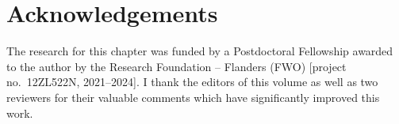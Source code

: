 \documentclass[output=paper,colorlinks,citecolor=brown]{langscibook}
\begin{document}
\section*{Acknowledgements}

\begin{sloppypar}
The research for this chapter was funded by a Postdoctoral Fellowship awarded to the author by the Research Foundation -- Flanders (FWO) [project no.~12ZL522N, 2021--2024]. I thank the editors of this volume as well as two reviewers for their valuable comments which have significantly improved this work.
\end{sloppypar}


{\sloppy\printbibliography[heading=subbibliography,notkeyword=this]}
\end{document}
